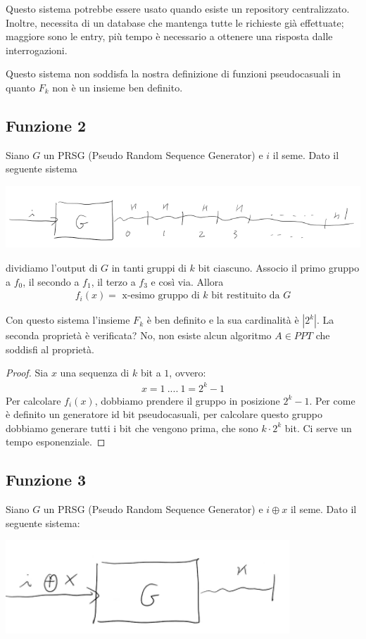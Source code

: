 \noindent Questo sistema potrebbe essere usato quando esiste un repository centralizzato. Inoltre, necessita di un database che mantenga tutte le richieste già effettuate; maggiore sono le entry, più tempo è necessario a ottenere una risposta dalle interrogazioni.

Questo sistema non soddisfa la nostra definizione di funzioni pseudocasuali in quanto $F_k$ non è un insieme ben definito.

\subsection{Funzione 2}
Siano $G$ un PRSG (Pseudo Random Sequence Generator) e $i$ il seme. Dato il seguente sistema
\begin{center}
    \includegraphics[width=1\textwidth]{images/fun2.png}
\end{center}

\noindent dividiamo l'output di $G$ in tanti gruppi di $k$ bit ciascuno. Associo il primo gruppo a $f_0$, il secondo a $f_1$, il terzo a $f_3$ e così via. Allora 
\begin{align*}
    f_i(x) = \text{ x-esimo gruppo di $k$ bit restituito da $G$}
\end{align*}

\noindent Con questo sistema l'insieme $F_k$ è ben definito e la sua cardinalità è $|2^k|$. La seconda proprietà è verificata? No, non esiste alcun algoritmo $A \in PPT$ che soddisfi al proprietà.
\begin{proof}
    Sia $x$ una sequenza di $k$ bit a $1$, ovvero:
    \begin{align*}
       x = 1 \ .... \ 1 = 2^{k}-1
    \end{align*}
    \noindent Per calcolare $f_i(x)$, dobbiamo prendere il gruppo in posizione $2^k-1$. Per come è definito un generatore id bit pseudocasuali, per calcolare questo gruppo dobbiamo generare tutti i bit che vengono prima, che sono $k \cdot 2^k$ bit. Ci serve un tempo esponenziale.
\end{proof}

\subsection{Funzione 3}
Siano $G$ un PRSG (Pseudo Random Sequence Generator) e $i \oplus x$ il seme. Dato il seguente sistema:
\begin{center}
    \includegraphics[width=0.8\textwidth]{images/fun3.png}
\end{center}

